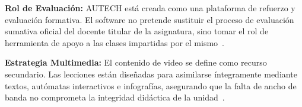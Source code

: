 \textbf{Rol de Evaluación:} AUTECH está creada como una plataforma de refuerzo y evaluación
formativa. El software no pretende sustituir el proceso de evaluación sumativa oficial del
docente titular de la asignatura, sino tomar el rol de herramienta de apoyo a las clases
impartidas por el mismo~\cite{escom2016}.

\textbf{Estrategia Multimedia:} El contenido de video se define como recurso secundario. Las
lecciones están diseñadas para asimilarse íntegramente mediante textos, autómatas interactivos
e infografías, asegurando que la falta de ancho de banda no comprometa la integridad
didáctica de la unidad~\cite{crompton2018}.